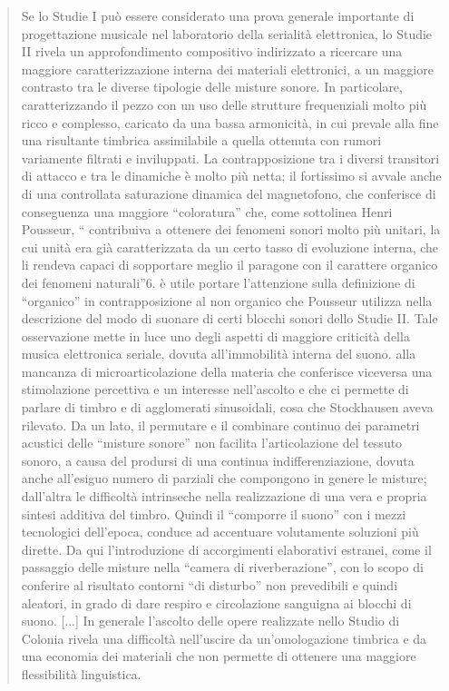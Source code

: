 \begin{quote}
	Se lo Studie I può essere considerato una prova generale importante di progettazione musicale nel laboratorio della serialità elettronica, lo Studie II rivela un approfondimento compositivo indirizzato a ricercare una maggiore caratterizzazione interna dei materiali elettronici, a un maggiore contrasto tra le diverse tipologie delle misture sonore. In particolare, caratterizzando il pezzo con un uso delle strutture frequenziali molto più ricco e complesso, caricato da una bassa armonicità, in cui prevale alla fine una risultante timbrica assimilabile a quella ottenuta con rumori variamente filtrati e inviluppati. La contrapposizione tra i diversi transitori di attacco e tra le dinamiche è molto più netta; il fortissimo si avvale anche di una controllata saturazione dinamica del magnetofono, che conferisce di conseguenza una maggiore “coloratura” che, come sottolinea Henri Pousseur, “ contribuiva a ottenere dei fenomeni sonori molto più unitari, la cui unità era già caratterizzata da un certo tasso di evoluzione interna, che li rendeva capaci di sopportare meglio il paragone con il carattere organico dei fenomeni naturali”6.
	è utile portare l’attenzione sulla definizione di “organico” in contrapposizione al non organico che Pousseur utilizza nella descrizione del modo di suonare di certi blocchi sonori dello Studie II. Tale osservazione mette in luce uno degli aspetti di maggiore criticità della musica elettronica seriale, dovuta all’immobilità interna del suono. alla mancanza di microarticolazione della materia che conferisce viceversa una stimolazione percettiva e un interesse nell’ascolto e che ci permette di parlare di timbro e di agglomerati sinusoidali, cosa che Stockhausen aveva rilevato.
	Da un lato, il permutare e il combinare continuo dei parametri acustici delle “misture sonore” non facilita l’articolazione del tessuto sonoro, a causa del prodursi di una continua indifferenziazione, dovuta anche all’esiguo numero di parziali che compongono in genere le misture; dall’altra le difficoltà intrinseche nella realizzazione di una vera e propria sintesi additiva del timbro. Quindi il “comporre il suono” con i mezzi tecnologici dell’epoca, conduce ad accentuare volutamente soluzioni più dirette. Da qui l’introduzione di accorgimenti elaborativi estranei, come il passaggio delle misture nella “camera di riverberazione”, con lo scopo di conferire al risultato contorni “di disturbo” non prevedibili e quindi aleatori, in grado di dare respiro e circolazione sanguigna ai blocchi di suono.
	[...] In generale l’ascolto delle opere realizzate nello Studio di Colonia rivela una difficoltà nell’uscire da un’omologazione timbrica e da una economia dei materiali che non permette di ottenere una maggiore flessibilità linguistica.

\end{quote}
